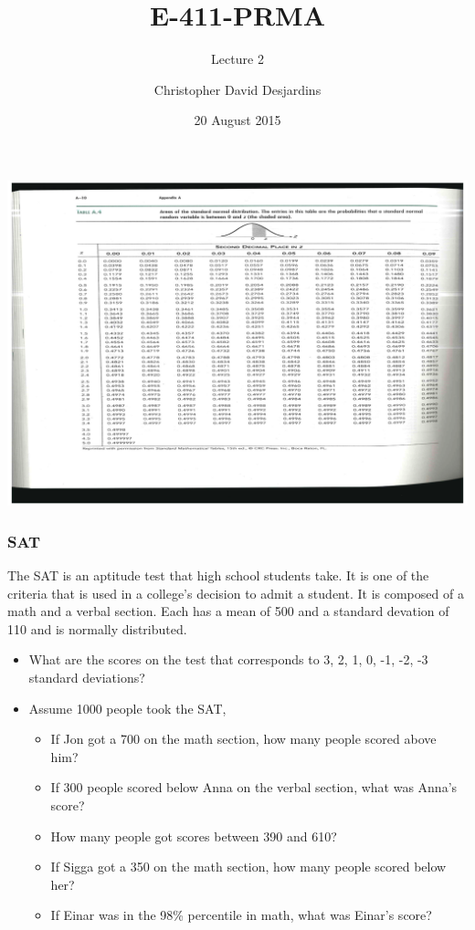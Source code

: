 \documentclass[dvipsnames]{beamer}\usepackage[]{graphicx}\usepackage[]{color}
\title{E-411-PRMA}
\subtitle{Lecture 2}
\author{Christopher David Desjardins}
\date{20 August 2015}
\begin{document}
\frame{\titlepage}


\begin{frame}
\begin{center}
\includegraphics[trim = 100 0 0 0, clip = TRUE, scale = .4]{images/ztable.png}
\end{center}
\end{frame}

\begin{frame}
  \frametitle{SAT}
  
  The SAT is an aptitude test that high school students take. It is one of the criteria that is used in a college's decision to admit a student. It is composed of a math and a verbal section. Each has a mean of 500 and a standard devation of 110 and is normally distributed. 
  \begin{itemize}
  \item<1-> What are the scores on the test that corresponds to 3, 2, 1, 0, -1, -2, -3 standard deviations?
  \item<2-> Assume 1000 people took the SAT,
  \begin{itemize}
    \item<3-> If Jon got a 700 on the math section, how many people scored above him?
    \item<4-> If 300 people scored below Anna on the verbal section, what was Anna's score?
    \item<5-> How many people got scores between 390 and 610?
    \item<6-> If Sigga got a 350 on the math section, how many people scored below her?
    \item<7-> If Einar was in the 98\% percentile in math, what was Einar's score?
  \end{itemize}
  \end{itemize}
\end{frame}
\end{document}
